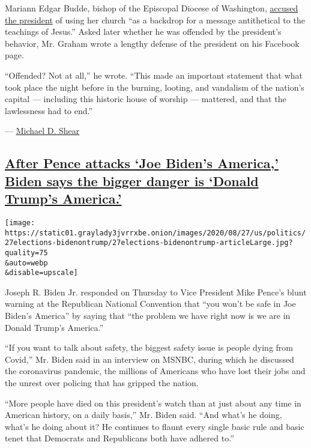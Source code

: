 Mariann Edgar Budde, bishop of the Episcopal Diocese of Washington,
\href{https://twitter.com/washdio/status/1267616423142141954}{accused
the president} of using her church ``as a backdrop for a message
antithetical to the teachings of Jesus.'' Asked later whether he was
offended by the president's behavior, Mr. Graham wrote a lengthy defense
of the president on his Facebook page.

``Offended? Not at all,'' he wrote. ``This made an important statement
that what took place the night before in the burning, looting, and
vandalism of the nation's capital --- including this historic house of
worship --- mattered, and that the lawlessness had to end.''

--- \href{https://www.nytimes3xbfgragh.onion/by/michael-d-shear}{Michael
D. Shear}

\hypertarget{after-pence-attacks-joe-bidens-america-biden-says-the-bigger-danger-is-donald-trumps-america}{%
\subsection{\texorpdfstring{\protect\hyperlink{after-pence-attacks-joe-bidens-america-biden-says-the-bigger-danger-is-donald-trumps-america}{After
Pence attacks `Joe Biden's America,' Biden says the bigger danger is
`Donald Trump's
America.'}}{After Pence attacks `Joe Biden's America,' Biden says the bigger danger is `Donald Trump's America.'}}\label{after-pence-attacks-joe-bidens-america-biden-says-the-bigger-danger-is-donald-trumps-america}}

\texttt{[image: https://static01.graylady3jvrrxbe.onion/images/2020/08/27/us/politics/27elections-bidenontrump/27elections-bidenontrump-articleLarge.jpg?quality=75\\\&auto=webp\\\&disable=upscale]}

Joseph R. Biden Jr. responded on Thursday to Vice President Mike Pence's
blunt warning at the Republican National Convention that ``you won't be
safe in Joe Biden's America'' by saying that ``the problem we have right
now is we are in Donald Trump's America.''

``If you want to talk about safety, the biggest safety issue is people
dying from Covid,'' Mr. Biden said in an interview on MSNBC, during
which he discussed the coronavirus pandemic, the millions of Americans
who have lost their jobs and the unrest over policing that has gripped
the nation.

``More people have died on this president's watch than at just about any
time in American history, on a daily basis,'' Mr. Biden said. ``And
what's he doing, what's he doing about it? He continues to flaunt every
single basic rule and basic tenet that Democrats and Republicans both
have adhered to.''

